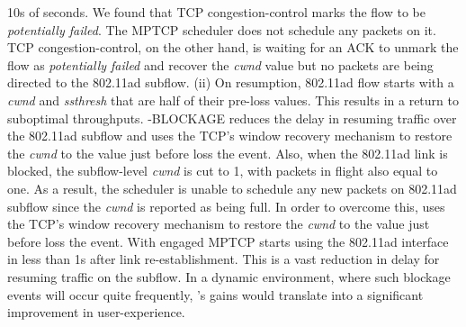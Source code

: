 10s of seconds.
We found that 
TCP congestion-control 
marks
the flow to be
\emph{potentially failed}. The MPTCP scheduler 
does not schedule any
packets on it. TCP congestion-control, on the other hand, is waiting
for an ACK to 
unmark the flow as \emph{potentially failed} and 
recover the \emph{cwnd} value but no packets are being directed to
the 802.11ad subflow.
\fi
\noindent(ii) On
resumption, 802.11ad flow starts with a \emph{cwnd} and
\emph{ssthresh} that are half of their pre-loss
values. 
This results in a return to suboptimal throughputs.
\name-BLOCKAGE reduces the delay in resuming traffic over the 802.11ad
subflow 
and uses the TCP's window recovery
mechanism to restore the \emph{cwnd} to the value just before loss the
event. 
Also, 
when the 802.11ad link is blocked, the
subflow-level \emph{cwnd} is cut to 1, with packets in flight also
equal to one. As a result, the scheduler is unable to schedule any new
packets on 802.11ad subflow since the \emph{cwnd} is reported as being
full. In order to overcome this, \name uses the TCP's window recovery
mechanism to restore the \emph{cwnd} to the value just before loss the
event. 
\fi 
With \name engaged 
MPTCP starts using the 802.11ad interface in less than 1s after link re-establishment. This
is a vast reduction in delay for resuming traffic on the subflow. In a
dynamic environment, where such blockage events will occur quite
frequently, \name's gains would translate into a significant
improvement in user-experience.
